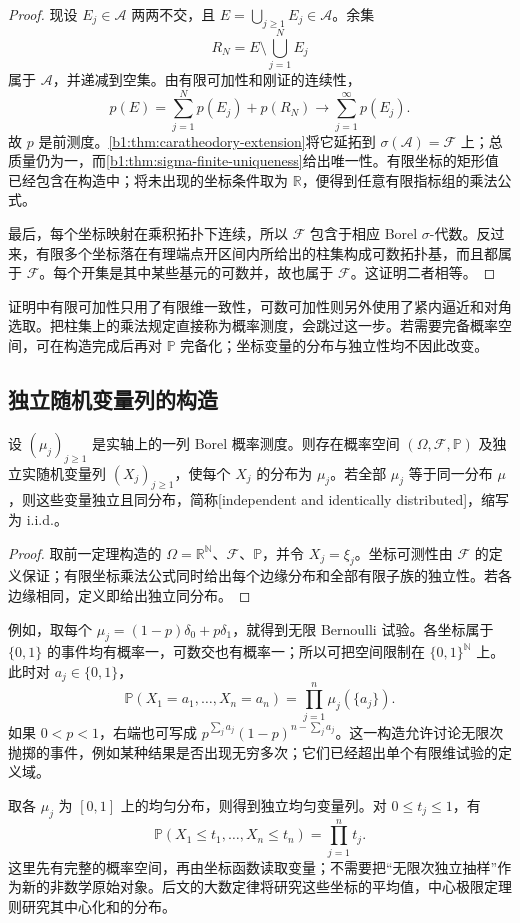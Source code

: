 \begin{proof}
现设 \(E_j\in\mathcal A\) 两两不交，且 \(E=\bigcup_{j\geq1}E_j\in\mathcal A\)。余集
\[
 R_N=E\setminus\bigcup_{j=1}^NE_j
\]
属于 \(\mathcal A\)，并递减到空集。由有限可加性和刚证的连续性，
\[
 p(E)=\sum_{j=1}^Np(E_j)+p(R_N)
 \longrightarrow\sum_{j=1}^{\infty}p(E_j).
\]
故 \(p\) 是前测度。\cref{b1:thm:caratheodory-extension}将它延拓到 \(\sigma(\mathcal A)=\mathcal F\) 上；总质量仍为一，而\cref{b1:thm:sigma-finite-uniqueness}给出唯一性。有限坐标的矩形值已经包含在构造中；将未出现的坐标条件取为 \(\mathbb R\)，便得到任意有限指标组的乘法公式。

最后，每个坐标映射在乘积拓扑下连续，所以 \(\mathcal F\) 包含于相应 Borel \(\sigma\)-代数。反过来，有限多个坐标落在有理端点开区间内所给出的柱集构成可数拓扑基，而且都属于 \(\mathcal F\)。每个开集是其中某些基元的可数并，故也属于 \(\mathcal F\)。这证明二者相等。
\end{proof}

证明中有限可加性只用了有限维一致性，可数可加性则另外使用了紧内逼近和对角选取。把柱集上的乘法规定直接称为概率测度，会跳过这一步。若需要完备概率空间，可在构造完成后再对 \(\mathbb P\) 完备化；坐标变量的分布与独立性均不因此改变。

\subsection{独立随机变量列的构造}
\label{b1:subsec:300204}

\begin{corollary}\label{b1:cor:30-iid-construction}
设 \((\mu_j)_{j\geq1}\) 是实轴上的一列 Borel 概率测度。则存在概率空间 \((\Omega,\mathcal F,\mathbb P)\) 及独立实随机变量列 \((X_j)_{j\geq1}\)，使每个 \(X_j\) 的分布为 \(\mu_j\)。若全部 \(\mu_j\) 等于同一分布 \(\mu\)，则这些变量独立且同分布，简称[independent and identically distributed]，缩写为 i.i.d.。
\end{corollary}
\begin{proof}
取前一定理构造的 \(\Omega=\mathbb R^{\mathbb N}\)、\(\mathcal F\)、\(\mathbb P\)，并令 \(X_j=\xi_j\)。坐标可测性由 \(\mathcal F\) 的定义保证；有限坐标乘法公式同时给出每个边缘分布和全部有限子族的独立性。若各边缘相同，定义即给出独立同分布。
\end{proof}

例如，取每个 \(\mu_j=(1-p)\delta_0+p\delta_1\)，就得到无限 Bernoulli 试验。各坐标属于 \(\{0,1\}\) 的事件均有概率一，可数交也有概率一；所以可把空间限制在 \(\{0,1\}^{\mathbb N}\) 上。此时对 \(a_j\in\{0,1\}\)，
\[
 \mathbb P(X_1=a_1,\ldots,X_n=a_n)
 =\prod_{j=1}^n\mu_j(\{a_j\}).
\]
如果 \(0<p<1\)，右端也可写成 \(p^{\sum_ja_j}(1-p)^{n-\sum_ja_j}\)。这一构造允许讨论无限次抛掷的事件，例如某种结果是否出现无穷多次；它们已经超出单个有限维试验的定义域。

\ProseParagraphBreak

取各 \(\mu_j\) 为 \([0,1]\) 上的均匀分布，则得到独立均匀变量列。对 \(0\leq t_j\leq1\)，有
\[
 \mathbb P(X_1\leq t_1,\ldots,X_n\leq t_n)=\prod_{j=1}^nt_j.
\]
这里先有完整的概率空间，再由坐标函数读取变量；不需要把“无限次独立抽样”作为新的非数学原始对象。后文的大数定律将研究这些坐标的平均值，中心极限定理则研究其中心化和的分布。
